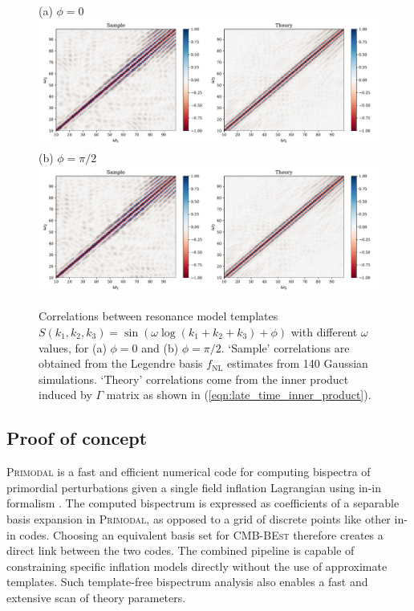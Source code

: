 \begin{figure}[htbp!] 
	\centering
	(a) $ \phi=0 $
	\includegraphics[width=\textwidth]{sinlog_template_correlations_new.pdf}
	(b) $ \phi=\pi/2 $
	\includegraphics[width=\textwidth]{coslog_template_correlations_new.pdf}
	\caption{Correlations between resonance model templates $S(k_1,k_2,k_3) = \sin(\omega\log(k_1+k_2+k_3)+\phi)$ with different $\omega$ values, for (a) $\phi = 0$ and (b) $\phi=\pi/2$. `Sample' correlations are obtained from the Legendre basis $f_\text{NL}$ estimates from 140 Gaussian simulations. `Theory' correlations come from the inner product induced by $\Gamma$ matrix as shown in (\ref{eqn:late_time_inner_product}).}
	\label{fig:sinlog_template_correlations}
\end{figure}


\subsection{Proof of concept} \label{section:proof_of_concept}


\textsc{Primodal} is a fast and efficient numerical code for computing bispectra of primordial perturbations given a single field inflation Lagrangian using in-in formalism \cite{Clarke2021}. The computed bispectrum is expressed as coefficients of a separable basis expansion in \textsc{Primodal}, as opposed to a grid of discrete points like other in-in codes. Choosing an equivalent basis set for \textsc{CMB-BEst} therefore creates a direct link between the two codes. The combined pipeline is capable of constraining specific inflation models directly without the use of approximate templates. Such template-free bispectrum analysis also enables a fast and extensive scan of theory parameters.

